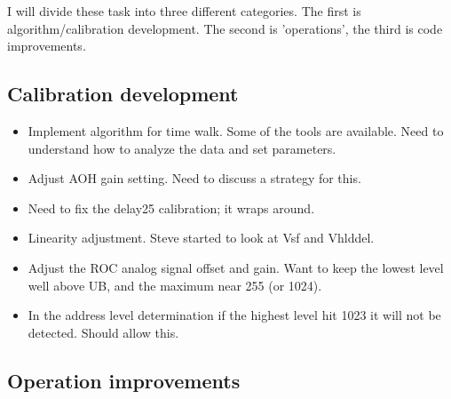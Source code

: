 
I will divide these task into three different categories.
The first is algorithm/calibration development. The second
is 'operations', the third is code improvements.

\subsection{Calibration development}
\begin{itemize}
\item Implement algorithm for time walk. Some of the tools are
      available. Need to understand how to analyze the data
      and set parameters.
\item Adjust AOH gain setting. Need to discuss a strategy for this.
\item Need to fix the delay25 calibration; it wraps around.
\item Linearity adjustment. Steve started to look at Vsf and Vhlddel.
\item Adjust the ROC analog signal offset and gain. Want to keep the
      lowest level well above UB, and the maximum near 255 (or 1024).
\item In the address level determination if the highest level hit 1023 it 
      will not be detected. Should allow this.
\end{itemize}

\subsection{Operation improvements}

